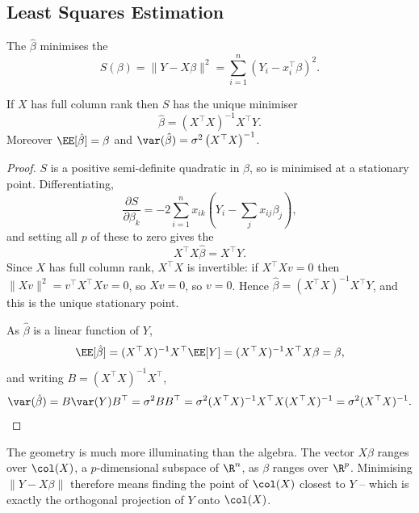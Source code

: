 \subsection{Least Squares Estimation}

\begin{definition}
  The  $\hat\beta$ minimises the 
  $$
  S(\beta) = \|Y - X\beta\|^2 = \sum_{i=1}^{n}\left(Y_i - x_i^\top\beta\right)^2.
  $$
\end{definition}

\begin{proposition}
  If $X$ has full column rank then $S$ has the unique minimiser
  $$
  \hat\beta = \left(X^\top X\right)^{-1}X^\top Y.
  $$
  Moreover $\EE[\hat\beta] = \beta$ and $\var(\hat\beta) = \sigma^2\left(X^\top X\right)^{-1}$.
\end{proposition}
\begin{proof}
  $S$ is a positive semi-definite quadratic in $\beta$, so is minimised at a stationary point. Differentiating,
  $$
  \frac{\partial S}{\partial\beta_k} = -2\sum_{i=1}^{n}x_{ik}\left(Y_i - \sum_j x_{ij}\beta_j\right),
  $$
  and setting all $p$ of these to zero gives the 
  $$
  X^\top X\hat\beta = X^\top Y.
  $$
  Since $X$ has full column rank, $X^\top X$ is invertible: if $X^\top X v = 0$ then $\|Xv\|^2 = v^\top X^\top X v = 0$, so $Xv = 0$, so $v = 0$. Hence $\hat\beta = (X^\top X)^{-1}X^\top Y$, and this is the unique stationary point.

  As $\hat\beta$ is a linear function of $Y$,
  $$
  \EE[\hat\beta] = (X^\top X)^{-1}X^\top\EE[Y] = (X^\top X)^{-1}X^\top X\beta = \beta,
  $$
  and writing $B = (X^\top X)^{-1}X^\top$,
  $$
  \var(\hat\beta) = B\var(Y)B^\top = \sigma^2 B B^\top = \sigma^2(X^\top X)^{-1}X^\top X (X^\top X)^{-1} = \sigma^2(X^\top X)^{-1}. \qedhere
  $$
\end{proof}

The geometry is much more illuminating than the algebra. The vector $X\beta$ ranges over $\col(X)$, a $p$-dimensional subspace of $\R^n$, as $\beta$ ranges over $\R^p$. Minimising $\|Y - X\beta\|$ therefore means finding the point of $\col(X)$ closest to $Y$ -- which is exactly the orthogonal projection of $Y$ onto $\col(X)$.

